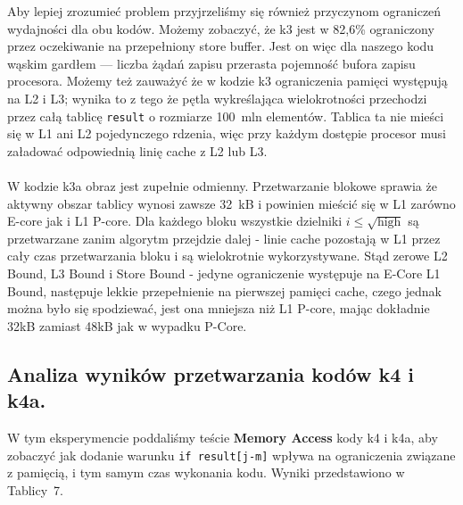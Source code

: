 \documentclass[10pt]{article}
\begin{document}
Aby lepiej zrozumieć problem przyjrzeliśmy się również przyczynom ograniczeń 
wydajności dla obu kodów. Możemy zobaczyć, że k3 jest w 82,6\% ograniczony 
przez oczekiwanie na przepełniony store buffer. Jest on więc dla naszego kodu 
wąskim gardłem — liczba żądań zapisu przerasta pojemność bufora zapisu procesora. 
Możemy też zauważyć że w kodzie k3 ograniczenia pamięci występują na L2 i L3; wynika to z tego że pętla wykreślająca wielokrotności 
przechodzi przez całą tablicę \texttt{result} o rozmiarze 100~mln elementów. 
Tablica ta nie mieści się w L1 ani L2 pojedynczego rdzenia, więc przy każdym 
dostępie procesor musi załadować odpowiednią linię cache z L2 lub L3.
\\ \\

W kodzie k3a obraz jest zupełnie odmienny. Przetwarzanie blokowe sprawia że aktywny 
obszar tablicy wynosi zawsze 32~kB i powinien mieścić się w L1 zarówno E-core jak i L1 P-core. Dla każdego bloku 
wszystkie dzielniki $i \leq \sqrt{\text{high}}$ są przetwarzane zanim algorytm 
przejdzie dalej - linie cache pozostają w L1 przez cały czas przetwarzania bloku 
i są wielokrotnie wykorzystywane. Stąd zerowe L2 Bound, L3 Bound i Store Bound - 
jedyne ograniczenie występuje na E-Core L1 Bound, następuje lekkie przepełnienie na pierwszej pamięci cache,
czego jednak można było się spodziewać, jest ona mniejsza niż L1 P-core, mając dokładnie 32kB zamiast
48kB jak w wypadku P-Core.

\newpage

\subsection*{Analiza wyników przetwarzania kodów k4 i k4a.}
W tym eksperymencie poddaliśmy teście \textbf{Memory Access} kody k4 i k4a,
aby zobaczyć jak dodanie warunku \texttt{if result[j-m]} wpływa na ograniczenia związane z pamięcią,
i tym samym czas wykonania kodu. Wyniki przedstawiono w Tablicy~7.
\end{document}
